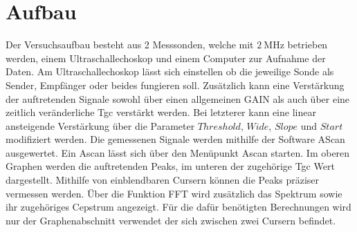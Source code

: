 \section{Aufbau}
\label{sec:Aufbau}
Der Versuchsaufbau besteht aus 2 Messsonden, welche mit $\SI{2}{\mega\hertz}$
betrieben werden, einem Ultraschallechoskop und einem Computer zur Aufnahme der Daten.
Am Ultraschallechoskop lässt sich einstellen ob die jeweilige Sonde als Sender,
Empfänger oder beides fungieren soll. Zusätzlich kann eine Verstärkung der
auftretenden Signale sowohl über einen allgemeinen GAIN als auch über eine zeitlich
veränderliche Tgc verstärkt werden. Bei letzterer kann eine linear ansteigende Verstärkung
über die Parameter $Threshold$, $Wide$, $Slope$ und $Start$
modifiziert werden. Die gemessenen Signale werden mithilfe der
Software AScan ausgewertet. Ein Ascan lässt sich über den Menüpunkt Ascan starten. Im oberen
Graphen werden die auftretenden Peaks, im unteren der zugehörige Tgc Wert
dargestellt. Mithilfe von einblendbaren Cursern können die Peaks präziser vermessen
werden. Über die Funktion FFT wird zusätzlich das Spektrum sowie ihr zugehöriges
Cepstrum angezeigt. Für die dafür benötigten Berechnungen wird nur der
Graphenabschnitt verwendet der sich zwischen zwei Cursern befindet.
